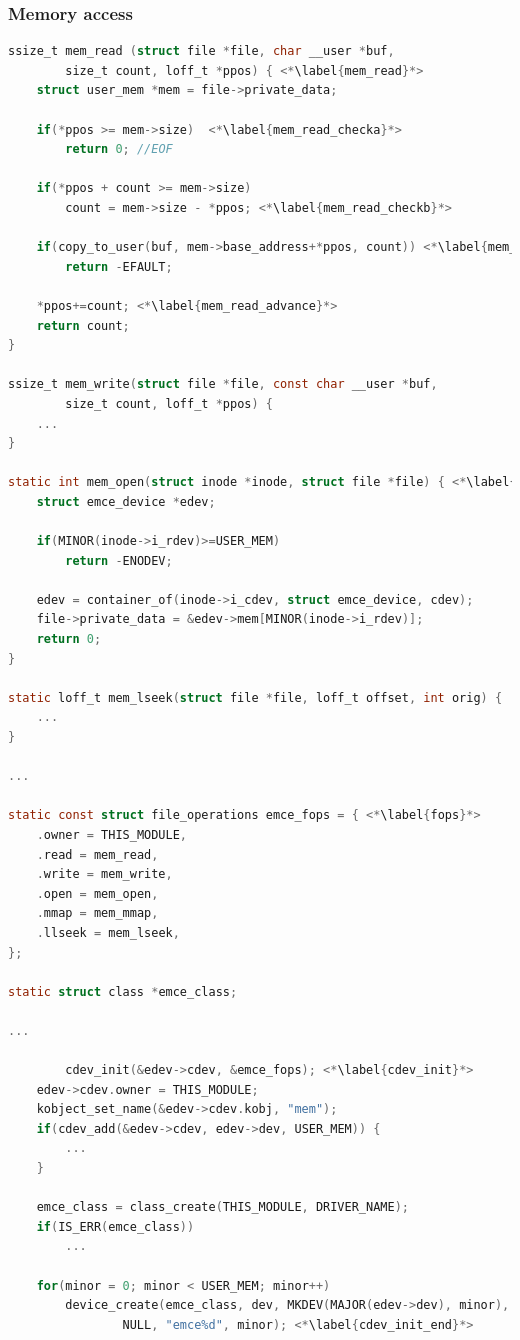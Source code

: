 \documentclass[11pt,technote,a4paper,onecolumn,dvips]{IEEEtran}
\begin{document}
\subsubsection{Memory access}
\begin{lstlisting}[float,language=C,caption={Character device},label=src:cdev,basicstyle=\ttfamily\tiny]
ssize_t mem_read (struct file *file, char __user *buf,
		size_t count, loff_t *ppos) { <*\label{mem_read}*>
	struct user_mem *mem = file->private_data;

	if(*ppos >= mem->size)  <*\label{mem_read_checka}*>
		return 0; //EOF

	if(*ppos + count >= mem->size)
		count = mem->size - *ppos; <*\label{mem_read_checkb}*>

	if(copy_to_user(buf, mem->base_address+*ppos, count)) <*\label{mem_read_copy}*>
		return -EFAULT;

	*ppos+=count; <*\label{mem_read_advance}*>
	return count;
}

ssize_t mem_write(struct file *file, const char __user *buf,
		size_t count, loff_t *ppos) {
	...
}

static int mem_open(struct inode *inode, struct file *file) { <*\label{mem_open}*>
	struct emce_device *edev;

	if(MINOR(inode->i_rdev)>=USER_MEM)
		return -ENODEV;

	edev = container_of(inode->i_cdev, struct emce_device, cdev);
	file->private_data = &edev->mem[MINOR(inode->i_rdev)];
	return 0;
}

static loff_t mem_lseek(struct file *file, loff_t offset, int orig) {
	...
}

...

static const struct file_operations emce_fops = { <*\label{fops}*>
	.owner = THIS_MODULE,
	.read = mem_read,
	.write = mem_write,
	.open = mem_open,
	.mmap = mem_mmap,
	.llseek = mem_lseek,
};

static struct class *emce_class;

...

        cdev_init(&edev->cdev, &emce_fops); <*\label{cdev_init}*>
	edev->cdev.owner = THIS_MODULE;
	kobject_set_name(&edev->cdev.kobj, "mem");
	if(cdev_add(&edev->cdev, edev->dev, USER_MEM)) {
		...
	}

	emce_class = class_create(THIS_MODULE, DRIVER_NAME);
	if(IS_ERR(emce_class))
		...

	for(minor = 0; minor < USER_MEM; minor++)
		device_create(emce_class, dev, MKDEV(MAJOR(edev->dev), minor),
				NULL, "emce%d", minor); <*\label{cdev_init_end}*>
\end{lstlisting}
\end{document}
